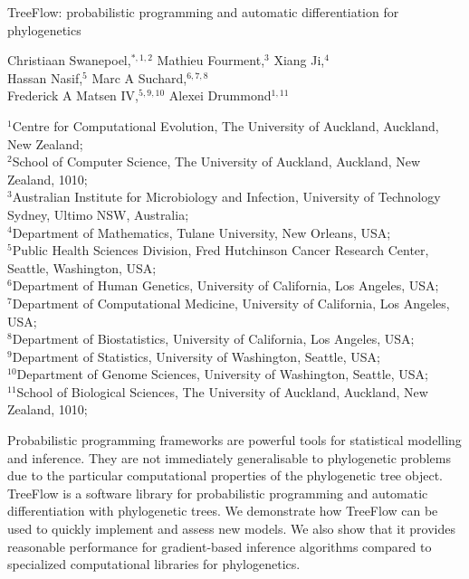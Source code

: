 
TreeFlow: probabilistic programming and automatic differentiation for phylogenetics

Christiaan Swanepoel,$^{\ast, 1, 2}$
Mathieu Fourment,$^{3}$
Xiang Ji,$^{4}$\\
Hassan Nasif,$^{5}$
Marc A Suchard,$^{6,7,8}$\\
Frederick A Matsen IV,$^{5,9,10}$
Alexei Drummond$^{1,11}$

${^1}$Centre for Computational Evolution, The University of Auckland, Auckland, New Zealand;\\
$^{2}$School of Computer Science, The University of Auckland, Auckland, New Zealand, 1010;\\
$^{3}$Australian Institute for Microbiology and Infection, University of Technology Sydney, Ultimo NSW, Australia;\\
$^{4}$Department of Mathematics, Tulane University, New Orleans, USA;\\
$^{5}$Public Health Sciences Division, Fred Hutchinson Cancer Research Center, Seattle, Washington, USA;\\
$^{6}$Department of Human Genetics, University of California, Los Angeles, USA;\\
$^{7}$Department of Computational Medicine, University of California, Los Angeles, USA;\\
$^{8}$Department of Biostatistics, University of California, Los Angeles, USA;\\
$^{9}$Department of Statistics, University of Washington, Seattle, USA;\\
$^{10}$Department of Genome Sciences, University of Washington, Seattle, USA;\\
$^{11}$School of Biological Sciences, The University of Auckland, Auckland, New Zealand, 1010;\\

\usepackage{booktabs}
\usepackage[outputdir=]{minted}
\usepackage{multirow}
\usepackage{setspace}

Probabilistic programming frameworks are powerful tools for statistical modelling and inference. They are not immediately generalisable to phylogenetic problems due to the particular computational properties of the phylogenetic tree object. TreeFlow is a software library for probabilistic programming and automatic differentiation with phylogenetic trees. We demonstrate how TreeFlow can be used to quickly implement and assess new models. We also show that it provides reasonable performance for gradient-based inference algorithms compared to specialized computational libraries for phylogenetics.

